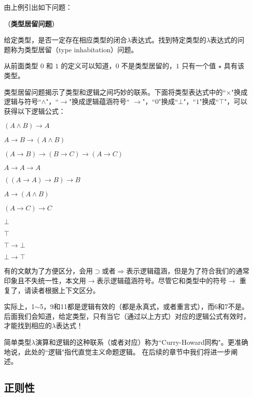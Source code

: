 由上例引出如下问题：

\begin{defn} （\textbf{类型居留问题}）

给定类型，是否一定存在相应类型的闭合$\lambda$表达式。找到特定类型的$\lambda$表达式的问题称为类型居留（type inhabitation）问题。

\end{defn}

从前面类型 $0$ 和 $1$ 的定义可以知道，$0$ 不是类型居留的，$1$ 只有一个值 $\star$ 具有该类型。

类型居留问题揭示了类型和逻辑之间巧妙的联系。下面将类型表达式中的``$\times$"换成逻辑与符号``$\land$"，``$\to$"换成逻辑蕴涵符号`` $\to$"，``$0$"换成``$\bot$"，``$1$"换成``$\top$"，可以获得以下逻辑公式：

\begin{tightenum}
  \item $( A \land B) \to A$
  \item $A \to B \to (A \land B)$
  \item $(A \to B) \to (B \to C) \to (A \to C)$
  \item $A \to A \to A$
  \item $((A \to A) \to B) \to B$
  \item $A \to (A \land B)$
  \item $(A \to C) \to C$
  \item $\bot$
  \item $\top$
  \item $\top \to \bot$
  \item $\bot \to \top$
\end{tightenum}

\begin{rem}
有的文献为了方便区分，会用$\supset$或者$\Rightarrow$表示逻辑蕴涵，但是为了符合我们的通常印象且不失统一性，本文用$\to$表示逻辑蕴涵符号。尽管它和类型中的符号$\to$ 重复了，请读者根据上下文区分。
\end{rem}

实际上，1$\sim$5，9和11都是逻辑有效的（都是永真式，或者重言式），而6和7不是。
后面我们会知道，给定类型，只有当它（通过以上方式）对应的逻辑公式有效时，才能找到相应的$\lambda$表达式！

简单类型$\lambda$演算和逻辑的这种联系（或者对应）称为``Curry-Howard同构"。更准确地说，此处的``逻辑"指代直觉主义命题逻辑。 在后续的章节中我们将进一步阐述。


\subsection{正则性}

